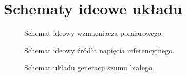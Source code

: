 \section{Schematy ideowe układu}
    \begin{figure}[!ht]
        \centering
        \scalebox{1}{}
        \caption{Schemat ideowy wzmacniacza pomiarowego.}
        \label{sch:INA333}
    \end{figure}
    \begin{figure}[!ht]
        \centering
        \scalebox{1}{}
        \caption{Schemat ideowy źródła napięcia referencyjnego.}
        \label{sch:Vref_gen}
    \end{figure}
    \begin{figure}[!ht]
        \centering
        \scalebox{1}{}
        \caption{Schemat układu generacji szumu białego.}
        \label{sch:Noise_gen}
    \end{figure}